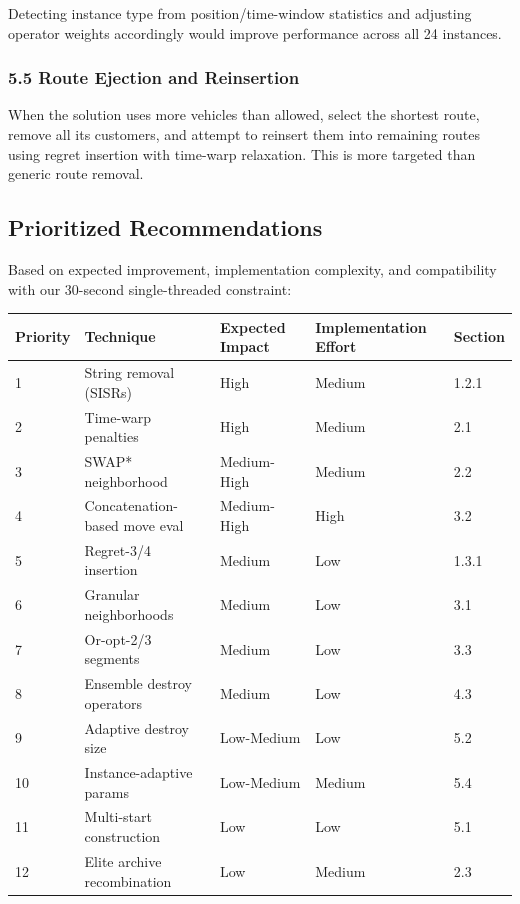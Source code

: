 \documentclass[twocolumn,10pt,letterpaper]{article}
\begin{document}
Detecting instance type from position/time-window statistics and adjusting operator weights accordingly would improve performance across all 24 instances.


\subsubsection{5.5 Route Ejection and Reinsertion}

When the solution uses more vehicles than allowed, select the shortest route, remove all its customers, and attempt to reinsert them into remaining routes using regret insertion with time-warp relaxation. This is more targeted than generic route removal.


\subsection{Prioritized Recommendations}

Based on expected improvement, implementation complexity, and compatibility with our 30-second single-threaded constraint:


\begin{table}[!ht]
\centering
\footnotesize
\begin{tabularx}{\textwidth}{@{}XXXXX@{}}
\toprule
\textbf{Priority} & \textbf{Technique} & \textbf{Expected Impact} & \textbf{Implementation Effort} & \textbf{Section} \\
\midrule
1 & String removal (SISRs) & High & Medium & 1.2.1 \\
2 & Time-warp penalties & High & Medium & 2.1 \\
3 & SWAP* neighborhood & Medium-High & Medium & 2.2 \\
4 & Concatenation-based move eval & Medium-High & High & 3.2 \\
5 & Regret-3/4 insertion & Medium & Low & 1.3.1 \\
6 & Granular neighborhoods & Medium & Low & 3.1 \\
7 & Or-opt-2/3 segments & Medium & Low & 3.3 \\
8 & Ensemble destroy operators & Medium & Low & 4.3 \\
9 & Adaptive destroy size & Low-Medium & Low & 5.2 \\
10 & Instance-adaptive params & Low-Medium & Medium & 5.4 \\
11 & Multi-start construction & Low & Low & 5.1 \\
12 & Elite archive recombination & Low & Medium & 2.3 \\
\bottomrule
\end{tabularx}
\end{table}
\end{document}
